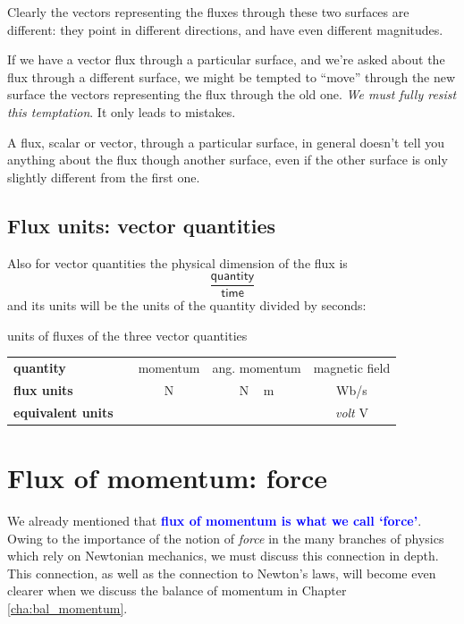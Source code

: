 \documentclass[a4paper,12pt,%
onecolumn,oneside,titlepage,%
british%
]{memoir}
\renewcommand*{\|}[1][]{\nonscript\:#1\vert\nonscript\:\mathopen{}}
\newcommand*{\sect}{\S}%
\newcommand*{\chap}{Chapter}%
\renewcommand*{\autoref}[2]{\sidepar{\vspace{-1ex}\footnotesize{\color{blue}\faIcon{%
reply%
}\enspace\sect\,\ref{#1} page\,\pageref{#1}}}\textcolor{blue}{#2}}
\begin{document}
Clearly the vectors representing the fluxes through these two surfaces are different: they point in different directions, and have even different magnitudes.

If we have a vector flux through a particular surface, and we're asked about the flux through a different surface, we might be tempted to \enquote{move} through the new surface the vectors representing the flux through the old one. \emph{We must fully resist this temptation}. It only leads to mistakes.
\begin{warning}
  A flux, scalar or vector, through a particular surface, in general doesn't tell you anything about the flux though another surface, even if the other surface is only slightly different from the first one.
\end{warning}

\subsection{Flux units: vector quantities}

Also for vector quantities the physical dimension of the flux is
\begin{equation*}
  \frac{\textsf{quantity}}{\textsf{time}}
\end{equation*}
and its units will be the units of the quantity divided by seconds:
\begin{definition}{units of fluxes of the three vector quantities}
  \centering
  \begin{tabular*}{\linewidth}{@{\extracolsep{\fill}}lcccc}
    \textbf{quantity}&& momentum & ang. momentum & magnetic field
    \\[2\jot]
    \textbf{flux units}&& \unit{N} & \unit{N\,m} & \unit{Wb/s}
    \\[2\jot]
    \textbf{equivalent units}&& &  & \emph{volt} \unit{V}
  \end{tabular*}
  \label{tab:fluxes_vector_units}
\end{definition}


\section{Flux of momentum: force}
\label{sec:force_is_flux}

We already mentioned that \autoref{sec:intro_momentum}{\textbf{flux of momentum is what we call \enquote*{force}}}. Owing to the importance of the notion of \emph{force} in the many branches of physics which rely on Newtonian mechanics, we must discuss this connection in depth. This connection, as well as the connection to Newton's laws, will become even clearer when we discuss the balance of momentum in \chap\,\ref{cha:bal_momentum}.
\end{document}
